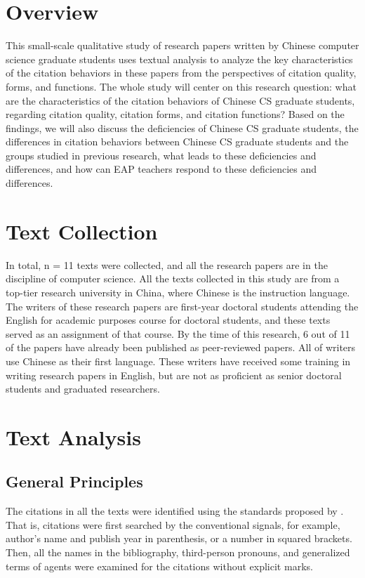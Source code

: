 \label{chap:methods}

\section{Overview}
This small-scale qualitative study of research papers written by Chinese computer science graduate students uses textual analysis to analyze the key characteristics of the citation behaviors in these papers from the perspectives of citation quality, forms, and functions. The whole study will center on this research question: what are the characteristics of the citation behaviors of Chinese CS graduate students, regarding citation quality, citation forms, and citation functions? Based on the findings, we will also discuss the deficiencies of Chinese CS graduate students, the differences in citation behaviors between Chinese CS graduate students and the groups studied in previous research, what leads to these deficiencies and differences, and how can EAP teachers respond to these deficiencies and differences.

\section{Text Collection}
In total, n = 11 texts were collected, and all the research papers are in the discipline of computer science. All the texts collected in this study are from a top-tier research university in China, where Chinese is the instruction language. The writers of these research papers are first-year doctoral students attending the English for academic purposes course for doctoral students, and these texts served as an assignment of that course. By the time of this research, 6 out of 11 of the papers have already been published as peer-reviewed papers. All of writers use Chinese as their first language. These writers have received some training in writing research papers in English, but are not as proficient as senior doctoral students and graduated researchers.

\section{Text Analysis}
\subsection{General Principles}
The citations in all the texts were identified using the standards proposed by \citet{hyland_academic_1999}. That is, citations were first searched by the conventional signals, for example, author’s name and publish year in parenthesis, or a number in squared brackets. Then, all the names in the bibliography, third-person pronouns, and generalized terms of agents were examined for the citations without explicit marks.

